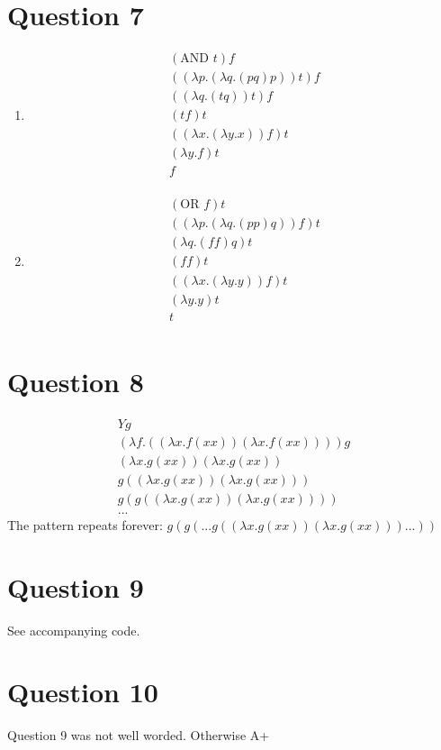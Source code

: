 \documentclass{article}
\newcommand{\lm}{\lambda}
\begin{document}
\section*{Question 7}
\begin{enumerate}
    \item
        \begin{multline*}
        (\text{AND } t) f \\
            ((\lm p.(\lm q.(p q) p)) t) f \\
            ((\lm q.(t q)) t) f\\
            (t f) t \\
            ((\lm x.(\lm y.x)) f) t \\
            (\lm y.f)t\\
            f\\
        \end{multline*}
    \item
    \begin{multline*}
        (\text{OR } f) t\\
        ((\lm p.(\lm q.(pp)q)) f) t\\
        (\lm q.(ff)q)t\\
        (ff)t\\
        ((\lm x.(\lm y.y))f)t\\
        (\lm y.y)t\\
        t\\
    \end{multline*}
\end{enumerate}

\section*{Question 8}
\begin{align*}
    Yg\\
    (\lm f.((\lm x.f(xx)) (\lm x.f(xx))))g\\
    (\lm x.g(x x))(\lm x.g(x x))\\
    g((\lm x.g(x x))(\lm x.g(x x)))\\
    g(g((\lm x.g(x x)) (\lm x.g(x x))))\\
    ...
\end{align*}
The pattern repeats forever: $g(g(...g((\lm x.g(xx))(\lm x.g(x x)))...))$

\section*{Question 9}
See accompanying code.

\section*{Question 10}
Question 9 was not well worded.
Otherwise A+
\end{document}
